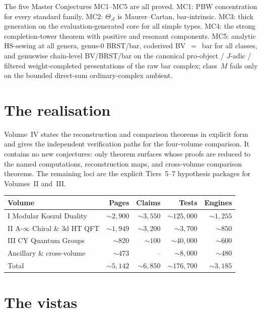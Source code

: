 \documentclass[11pt]{article}
\providecommand{\cA}{\mathcal{A}}
\begin{document}
The five Master Conjectures MC1--MC5 are all proved. MC1: PBW
concentration for every standard family. MC2: $\Theta_\cA$ is
Maurer--Cartan, bar-intrinsic. MC3: thick generation on the
evaluation-generated core for all simple types. MC4: the strong
completion-tower theorem with positive and resonant components.
MC5: analytic HS-sewing at all genera, genus-$0$ BRST/bar, coderived
BV~$=$~bar for all classes, and genuswise chain-level BV/BRST/bar on
the canonical pro-object / $J$-adic / filtered weight-completed
presentations of the raw bar complex; class~$M$ fails only on the
bounded direct-sum ordinary-complex ambient.

\section{The realisation}

\noindent
Volume~IV states the reconstruction and comparison theorems in explicit
form and gives the independent verification paths for the four-volume
comparison. It contains no new conjectures: only theorem surfaces whose
proofs are reduced to the named computations, reconstruction maps, and
cross-volume comparison theorems. The remaining loci are the explicit
Tiers~5--7 hypothesis packages for Volumes~II and~III.

\begin{center}
\renewcommand{\arraystretch}{1.3}
\begin{tabular}{lrrrr}
\textbf{Volume} & \textbf{Pages} & \textbf{Claims} & \textbf{Tests} & \textbf{Engines}\\
\hline
I Modular Koszul Duality & $\sim 2{,}900$ & $\sim 3{,}550$ & $\sim 125{,}000$ & $\sim 1{,}255$ \\
II A-$\infty$ Chiral \& 3d HT QFT & $\sim 1{,}949$ & $\sim 3{,}200$ & $\sim 3{,}700$ & $\sim 850$ \\
III CY Quantum Groups & $\sim 820$ & $\sim 100$ & $\sim 40{,}000$ & $\sim 600$ \\
Ancillary \& cross-volume & $\sim 473$ & -- & $\sim 8{,}000$ & $\sim 480$ \\
\hline
Total & $\sim 5{,}142$ & $\sim 6{,}850$ & $\sim 176{,}700$ & $\sim 3{,}185$
\end{tabular}
\end{center}

\section{The vistas}
\end{document}
